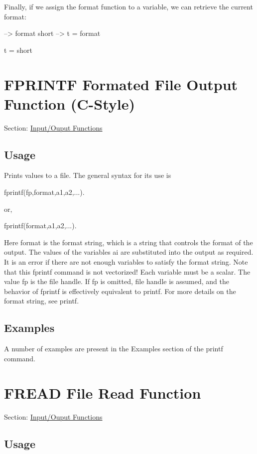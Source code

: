Finally, if we assign the {\ttfamily format} function to a variable, we can retrieve the current format\-:


\begin{DoxyVerbInclude}
--> format short
--> t = format

t = 
short
\end{DoxyVerbInclude}
 \hypertarget{io_fprintf}{}\section{F\-P\-R\-I\-N\-T\-F Formated File Output Function (C-\/\-Style)}\label{io_fprintf}
Section\-: \hyperlink{sec_io}{Input/\-Ouput Functions} \hypertarget{vtkwidgets_vtkxyplotwidget_Usage}{}\subsection{Usage}\label{vtkwidgets_vtkxyplotwidget_Usage}
Prints values to a file. The general syntax for its use is \begin{DoxyVerb}  fprintf(fp,format,a1,a2,...).
\end{DoxyVerb}
 or, \begin{DoxyVerb}  fprintf(format,a1,a2,...).
\end{DoxyVerb}
 Here {\ttfamily format} is the format string, which is a string that controls the format of the output. The values of the variables {\ttfamily ai} are substituted into the output as required. It is an error if there are not enough variables to satisfy the format string. Note that this {\ttfamily fprintf} command is not vectorized! Each variable must be a scalar. The value {\ttfamily fp} is the file handle. If {\ttfamily fp} is omitted, file handle {} is assumed, and the behavior of {\ttfamily fprintf} is effectively equivalent to {\ttfamily printf}. For more details on the format string, see {\ttfamily printf}. \hypertarget{variables_matrix_Examples}{}\subsection{Examples}\label{variables_matrix_Examples}
A number of examples are present in the Examples section of the {\ttfamily printf} command. \hypertarget{io_fread}{}\section{F\-R\-E\-A\-D File Read Function}\label{io_fread}
Section\-: \hyperlink{sec_io}{Input/\-Ouput Functions} \hypertarget{vtkwidgets_vtkxyplotwidget_Usage}{}\subsection{Usage}\label{vtkwidgets_vtkxyplotwidget_Usage}
